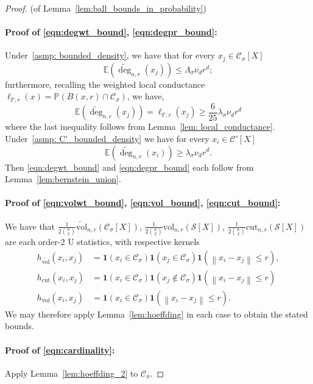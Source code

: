 \documentclass[11pt,twoside]{article}
\newcommand{\vol}{\mathrm{vol}}
\newcommand{\cut}{\mathrm{cut}}
\newcommand{\norm}[1]{\left\lVert#1\right\rVert}
\newcommand{\1}{\mathbf{1}}
\newcommand{\Xbf}{X}             %
\newcommand{\Pbb}{\mathbb{P}}
\newcommand{\Sset}{\mathcal{S}}
\newcommand{\Cset}{\mathcal{C}}
\newcommand{\Csig}{\Cset_{\sigma}}
\begin{document}
\begin{proof}{(of Lemma~\ref{lem:ball_bounds_in_probability})}
	\item[]
	\paragraph{Proof of \eqref{eqn:degwt_bound}, \eqref{eqn:degpr_bound}:}
	Under~\ref{asmp: bounded_density}, we have that for every $x_j \in \Csig[\Xbf]$
	\begin{equation*}
	\mathbb{E}(\widetilde{\deg}_{n,r}(x_j)) \leq \Lambda_{\sigma} \nu_d r^d;
	\end{equation*}
	furthermore, recalling the weighted local conductance $\ell_{\Pbb,r}(x) = \Pbb(B(x,r) \cap \Csig)$, we have,
	\begin{equation*}
	\mathbb{E}(\widetilde{\deg}_{n,r}(x_j)) = \ell_{\Pbb,r}(x_j) \geq \frac{6}{25} \lambda_{\sigma} \nu_d r^d
	\end{equation*}
	where the last inequality follows from Lemma~\ref{lem: local_conductance}.  Under~\ref{asmp: C'_bounded_density} we have for every $x_i \in \Cset'[\Xbf]$
	\begin{equation*}
	\mathbb{E}(\widetilde{\deg}_{n,r}(x_i)) \geq \lambda_{
		\sigma} \nu_d r^d.
	\end{equation*} 
	Then \eqref{eqn:degwt_bound} and \eqref{eqn:degpr_bound} each follow from Lemma~\ref{lem:bernstein_union}.
	
	\paragraph{Proof of \eqref{eqn:volwt_bound}, \eqref{eqn:vol_bound}, \eqref{eqn:cut_bound}:}
	
	We have that $\frac{1}{2{n \choose 2}}\widetilde{\vol}_{n,r}(\Csig[\Xbf])$, $\frac{1}{2{n \choose 2}}\vol_{n,r}(\Sset[\Xbf])$, $\frac{1}{2{n \choose 2}}\cut_{n,r}(\Sset[\Xbf])$ are each order-2 U statistics, with respective kernels
	\begin{align*}
	h_{\widetilde{\vol}}(x_i,x_j) & = \1(x_i \in \Csig)\1(x_j \in \Csig)\1(\norm{x_i - x_j} \leq r), \\ h_{\cut}(x_i,x_j) & = \1(x_i \in \Csig)\1(x_j \notin \Csig)\1(\norm{x_i - x_j} \leq r) \\
	h_{\vol}(x_i,x_j) & = \1(x_i \in \Csig)\1(\norm{x_i - x_j} \leq r).
	\end{align*}
	We may therefore apply Lemma~\ref{lem:hoeffding} in each case to obtain the stated bounds.
	
	\paragraph{Proof of \eqref{eqn:cardinality}:}
	Apply Lemma~\ref{lem:hoeffding_2} to $\Csig$.
\end{proof}
\end{document}
